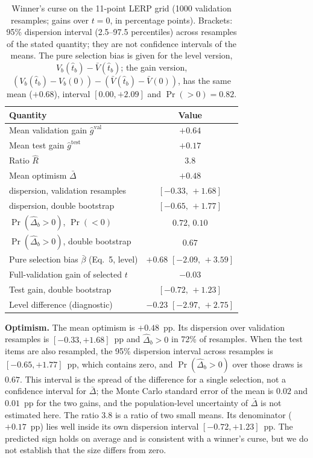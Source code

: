 \documentclass[conference]{IEEEtran}
\begin{document}
\begin{table}[!t]
\caption{Winner's curse on the 11-point LERP grid (1000 validation resamples; gains over $t=0$, in percentage points). Brackets: 95\% dispersion interval (2.5--97.5 percentiles) across resamples of the stated quantity; they are not confidence intervals of the means. The pure selection bias is given for the level version, $V_b(\hat t_b)-\bar V(\hat t_b)$; the gain version, $(V_b(\hat t_b)-V_b(0))-(\bar V(\hat t_b)-\bar V(0))$, has the same mean ($+0.68$), interval $[0.00,+2.09]$ and $\Pr(>0)=0.82$.}
\label{tab:gains}
\centering\small
\begin{tabular}{lc}
\toprule
Quantity & Value \\
\midrule
Mean validation gain $\hat g^{\mathrm{val}}$ & $+0.64$ \\
Mean test gain $\hat g^{\mathrm{test}}$ & $+0.17$ \\
Ratio $\hat R$ & $3.8$ \\
Mean optimism $\bar\Delta$ & $+0.48$ \\
\quad dispersion, validation resamples & $[-0.33,\,+1.68]$ \\
\quad dispersion, double bootstrap & $[-0.65,\,+1.77]$ \\
$\Pr(\hat\Delta_b>0)$, $\Pr(<0)$ & $0.72$, $0.10$ \\
$\Pr(\hat\Delta_b>0)$, double bootstrap & $0.67$ \\
Pure selection bias $\bar\beta$ (Eq.~5, level) & $+0.68$ $[-2.09,\,+3.59]$ \\
Full-validation gain of selected $t$ & $-0.03$ \\
Test gain, double bootstrap & $[-0.72,\,+1.23]$ \\
Level difference (diagnostic) & $-0.23$ $[-2.97,\,+2.75]$ \\
\bottomrule
\end{tabular}
\end{table}

\textbf{Optimism.} The mean optimism is $+0.48$~pp. Its dispersion over validation resamples is $[-0.33,+1.68]$~pp and $\hat\Delta_b>0$ in 72\% of resamples. When the test items are also resampled, the 95\% dispersion interval across resamples is $[-0.65,+1.77]$~pp, which contains zero, and $\Pr(\hat\Delta_b>0)$ over those draws is $0.67$. This interval is the spread of the difference for a single selection, not a confidence interval for $\bar\Delta$; the Monte Carlo standard error of the mean is $0.02$ and $0.01$~pp for the two gains, and the population-level uncertainty of $\bar\Delta$ is not estimated here. The ratio $3.8$ is a ratio of two small means. Its denominator ($+0.17$~pp) lies well inside its own dispersion interval $[-0.72,+1.23]$~pp. The predicted sign holds on average and is consistent with a winner's curse, but we do not establish that the size differs from zero.
\end{document}
